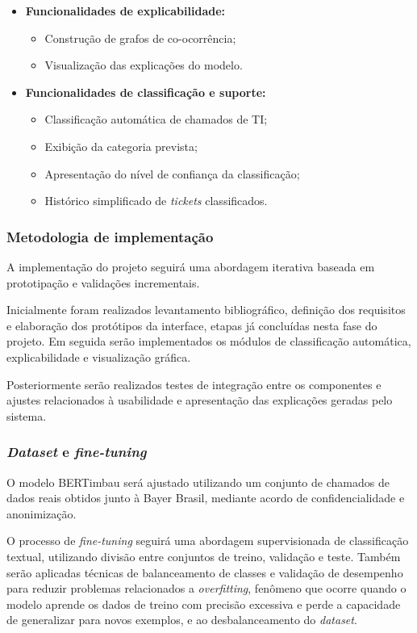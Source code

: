 \documentclass[
    12pt,                %
    openright,           %
    oneside,             %
    a4paper,             %
    english,             %
    brazil               %
]{abntex2}
\begin{document}
\begin{itemize}
    \item \textbf{Funcionalidades de explicabilidade:}
    \begin{itemize}
        \item Construção de grafos de co-ocorrência;
        \item Visualização das explicações do modelo.
    \end{itemize}
    \item \textbf{Funcionalidades de classificação e suporte:}
    \begin{itemize}
        \item Classificação automática de chamados de TI;
        \item Exibição da categoria prevista;
        \item Apresentação do nível de confiança da classificação;
        \item Histórico simplificado de \textit{tickets} classificados.
    \end{itemize}
\end{itemize}

\subsubsection{Metodologia de implementação}

A implementação do projeto seguirá uma abordagem iterativa baseada em prototipação e validações incrementais.

Inicialmente foram realizados levantamento bibliográfico, definição dos requisitos e elaboração dos protótipos da interface, etapas já concluídas nesta fase do projeto. Em seguida serão implementados os módulos de classificação automática, explicabilidade e visualização gráfica.

Posteriormente serão realizados testes de integração entre os componentes e ajustes relacionados à usabilidade e apresentação das explicações geradas pelo sistema.

\subsubsection{\textit{Dataset} e \textit{fine-tuning}}

O modelo BERTimbau será ajustado utilizando um conjunto de chamados de dados reais obtidos junto à Bayer Brasil, mediante acordo de confidencialidade e anonimização.

O processo de \textit{fine-tuning} seguirá uma abordagem supervisionada de classificação textual, utilizando divisão entre conjuntos de treino, validação e teste. Também serão aplicadas técnicas de balanceamento de classes e validação de desempenho para reduzir problemas relacionados a \textit{overfitting}, fenômeno que ocorre quando o modelo aprende os dados de treino com precisão excessiva e perde a capacidade de generalizar para novos exemplos, e ao desbalanceamento do \textit{dataset}.
\end{document}
